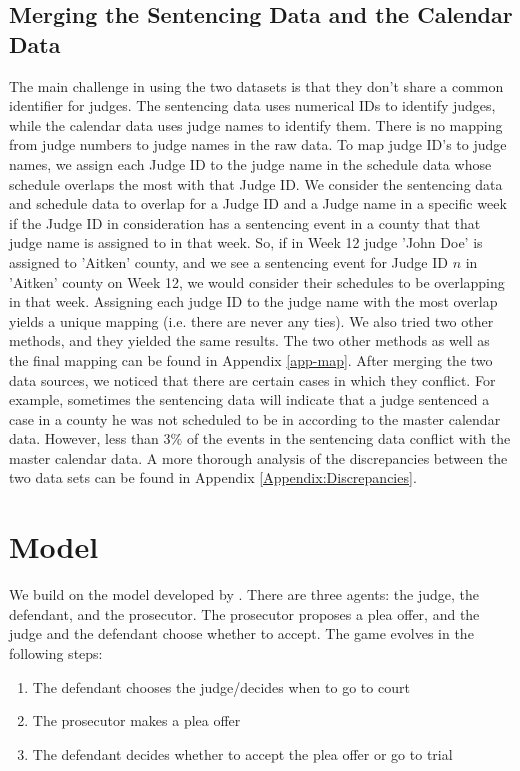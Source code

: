 \documentclass[11pt, oneside]{article}   	%
\theoremstyle{ModifiedStyle}
\begin{document}
  \subsection{Merging the Sentencing Data and the Calendar Data}
	  \label{mapping-judge-names}
    The main challenge in using the two datasets is that they don't share a common identifier for judges. The sentencing data uses numerical IDs to
    identify judges, while the calendar data uses judge names to identify them. There is no mapping from judge numbers to judge names in the raw data. To map judge ID's to judge names, we assign each Judge ID to the judge name in the schedule data whose schedule overlaps the most with that Judge ID. We consider the sentencing data and schedule data to overlap for a Judge ID and a Judge name in a specific week if the Judge ID in consideration has a sentencing event in a county that that judge name is assigned to in that week. So, if in Week 12 judge 'John Doe' is assigned to 'Aitken' county, and we see a sentencing event for Judge ID $n$ in 'Aitken' county on Week 12, we would consider their schedules to be overlapping in that week. Assigning each judge ID to the judge name with the most overlap yields a unique mapping (i.e. there are never any ties). We also tried two other methods, and they yielded the same results. The two other methods as well as the final mapping can be found in Appendix \ref{app-map}. After merging the two data sources, we noticed that there are certain cases in which they conflict. For example, sometimes the sentencing data will indicate that a judge sentenced a case in a county he was not scheduled to be in according to the master calendar data. However, less than $3\%$ of the events in the sentencing data conflict with the master calendar data. A more thorough analysis of the discrepancies between the two data sets can be found in Appendix \ref{Appendix:Discrepancies}.

\section{Model}
  We build on the model developed by \cite{wang2019}. There are three agents: the judge, the defendant, and the prosecutor. The prosecutor proposes a plea offer, and the judge and the defendant choose whether to accept. The game evolves in the following steps:

  \begin{enumerate}
    \item The defendant chooses the judge/decides when to go to court
    \item The prosecutor makes a plea offer
    \item The defendant decides whether to accept the plea offer or go to trial
  \end{enumerate}
\end{document}
